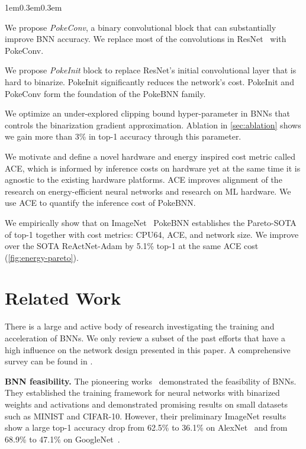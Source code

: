 \begin{tightlist}{1em}{0.3em}{0.3em}
    \item We propose \textit{PokeConv}, a binary convolutional block that can substantially improve BNN accuracy. We replace most of the convolutions in ResNet~\cite{He2016resnet} with PokeConv.
    \item We propose \textit{PokeInit} block to replace ResNet's initial convolutional layer that is hard to binarize. PokeInit significantly reduces the network's cost. PokeInit and PokeConv form the foundation of the PokeBNN family.
    \item We optimize an under-explored clipping bound hyper-parameter in BNNs that controls the binarization gradient approximation. Ablation in \ref{sec:ablation} shows we gain more than 3\% in top-1 accuracy through this parameter. 
    \item We motivate and define a novel hardware and energy inspired cost metric called ACE, which is informed by inference costs on hardware yet at the same time it is agnostic to the existing hardware platforms. ACE improves alignment of the research on energy-efficient neural networks and research on ML hardware. We use ACE to quantify the inference cost of PokeBNN.
    \item We empirically show that on ImageNet~\cite{olga2015imagenet} PokeBNN establishes the Pareto-SOTA of top-1 together with cost metrics: CPU64, ACE, and network size. We improve over the SOTA ReActNet-Adam by 5.1\% top-1 at the same ACE cost (\ref{fig:energy-pareto}).
\end{tightlist}

\section{Related Work}
\label{sec:related}

There is a large and active body of research investigating the training and acceleration of BNNs. We only review a subset of the past efforts that have a high influence on the network design presented in this paper. A comprehensive survey can be found in \cite{yuan2021comprehensive}.

\textbf{BNN feasibility.} The pioneering works~\cite{hubara2016bnn, cheng2015bnntrain, kim2016bitwise} demonstrated the feasibility of BNNs. They established the training framework for neural networks with binarized weights and activations and demonstrated promising results on small datasets such as MINIST and CIFAR-10. However, their preliminary ImageNet results show a large top-1 accuracy drop from 62.5\% to 36.1\% on AlexNet~\cite{alex2012alexnet} and from 68.9\% to 47.1\% on GoogleNet~\cite{szegedy2015googlenet}.


